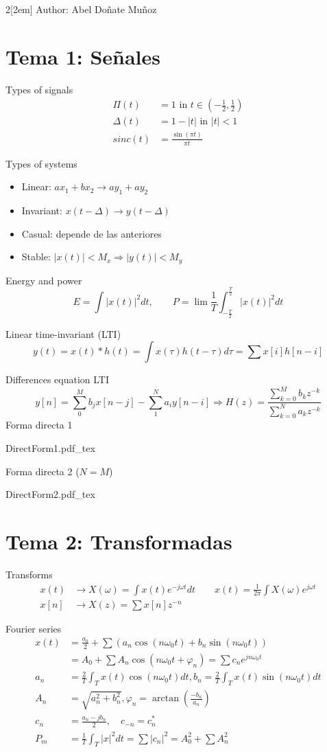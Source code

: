 \documentclass{myclass}
\newcommand{\incfig}[1]{%
{\center
\def\svgwidth{0.9\columnwidth}
{#1.pdf_tex}
\par}
}
\begin{document}
\begin{multicols}{2}[\columnsep2em]
Author: Abel Doñate Muñoz
\section{Tema 1: Señales}

Types of signals
\begin{align*}
  \Pi(t) &= 1 \text{ in } t\in (-\frac{1}{2}, \frac{1}{2}) \\
  \Delta(t)&= 1-|t| \text{ in } |t|<1 \\
  sinc(t) &= \frac{\sin(\pi t)}{\pi t}
\end{align*}

Types of systems
\begin{itemize}[topsep=-6pt, itemsep=0pt]
  \item Linear: $ax_1+bx_2 \to ay_1+ay_2$
  \item Invariant: $x(t-\Delta ) \to y(t-\Delta)$
  \item Casual: depende de las anteriores 
  \item Stable: $|x(t)|<M_x \Rightarrow |y(t)|<M_y$
\end{itemize}

Energy and power
\[
E = \int |x(t)|^2dt, \qquad P = \lim \frac{1}{T} \int_{-\frac{T}{2}}^{\frac{T}{2}} |x(t)|^2dt
\] 

Linear time-invariant (LTI)
\[
y(t) = x(t)\ast h(t) = \int x(\tau )h(t-\tau )d\tau = \sum x[i]h[n-i]
\] 

Differences equation LTI
\[
y[n] = \sum_0^M b_jx[n-j] - \sum_1^N a_iy[n-i] \Rightarrow H(z) = \frac{\sum_{k=0}^M b_kz^{-k}}{\sum_{k=0}^{N}a_kz^{-k}}
\] 
Forma directa 1
\incfig{DirectForm1}

Forma directa 2 ($N=M$)
\incfig{DirectForm2}

\section{Tema 2: Transformadas}

Transforms
\begin{align*}
  x(t) &\to X(\omega )= \int x(t)e^{-j\omega t}dt \qquad x(t)= \frac{1}{2\pi}\int X(\omega )e^{j\omega t} \\
  x[n] &\to X(z) = \sum x[n]z^{-n}
\end{align*}

Fourier series
\begin{align*}
	x(t) &= \frac{a_0}{2} + \sum \left( a_n\cos(n\omega _0t) + b_n \sin(n\omega _0t )\right)\\
		 &= A_0 + \sum A_n\cos(n\omega _0t + \varphi_n) = \sum c_n e^{jn\omega_0 t}\\
	a_n &= \frac{2}{T}\int_T x(t)\cos(n\omega _0t)dt,   b_n = \frac{2}{T}\int_T x(t)\sin(n\omega _0t)dt\\
	A_n &= \sqrt{a_n^2 + b_n^2}, \varphi_n = \arctan(\frac{-b_n}{a_n}) \\
	c_n &= \frac{a_n-jb_n}{2}, \quad c_{-n} = c_n^*\\
	P_m &= \frac{1}{T}\int_T|x|^2dt= \sum |c_n|^2= A_0^2 + \sum A_n^2
\end{align*}


\end{multicols}
\end{document}

